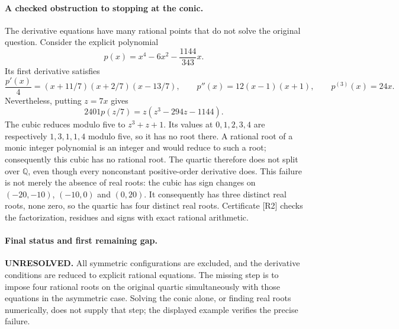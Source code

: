 \documentclass[11pt,a4paper]{article}
\begin{document}
\paragraph{A checked obstruction to stopping at the conic.}
The derivative equations have many rational points that do not solve
the original question. Consider the explicit polynomial
\[
               p(x)=x^4-6x^2-\frac{1144}{343}x.
\]
Its first derivative satisfies
\[
 \frac{p'(x)}4=(x+11/7)(x+2/7)(x-13/7),
 \qquad p''(x)=12(x-1)(x+1),\qquad p^{(3)}(x)=24x.
\]
Nevertheless, putting $z=7x$ gives
\[
             2401p(z/7)=z(z^3-294z-1144).
\]
The cubic reduces modulo five to $z^3+z+1$. Its values at
$0,1,2,3,4$ are respectively $1,3,1,1,4$ modulo five, so it has no
root there. A rational root of a monic integer polynomial is an
integer and would reduce to such a root; consequently this cubic has
no rational root. The quartic therefore does not split over
$\mathbb Q$, even though every nonconstant positive-order derivative
does. This failure is not merely the absence of real roots: the
cubic has sign changes on $(-20,-10)$, $(-10,0)$ and $(0,20)$.
It consequently has three distinct real roots, none zero, so the
quartic has four distinct real roots. Certificate [R2] checks the
factorization, residues and signs with exact rational arithmetic.

\paragraph{Final status and first remaining gap.}
\textbf{UNRESOLVED.} All symmetric configurations are excluded, and
the derivative conditions are reduced to explicit rational equations.
The missing step is to impose four rational roots on the original
quartic simultaneously with those equations in the asymmetric case.
Solving the conic alone, or finding real roots numerically, does not
supply that step; the displayed example verifies the precise failure.
\end{document}
